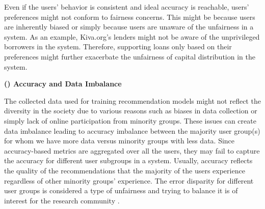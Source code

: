 Even if the users' behavior is consistent and ideal accuracy is reachable, users' preferences might not conform to fairness concerns. This might be because users are inherently biased or simply because users are unaware of the unfairness in a system. As an example, Kiva.org's lenders might not be aware of the unprivileged borrowers in the system. Therefore, supporting loans only based on their preferences might further exacerbate the unfairness of capital distribution in the system. 






\vspace{0.25cm}
\noindent \textbf{() Accuracy and Data Imbalance}
\vspace{0.25cm}

The collected data used for training recommendation models might not reflect the diversity in the society due to various reasons such as biases in data collection or simply lack of online participation from minority groups. These issues can create data imbalance leading to accuracy imbalance between the majority user group(s) for whom we have more data versus minority groups with less data. Since accuracy-based metrics are aggregated over all the users, they may fail to capture the accuracy for different user subgroups in a system. Usually, accuracy reflects the quality of the recommendations that the majority of the users experience regardless of other minority groups' experience. The error disparity for different user groups is considered a type of unfairness and trying to balance it is of interest for the research community \cite{ekstrand2018all,yao2017beyond}.

